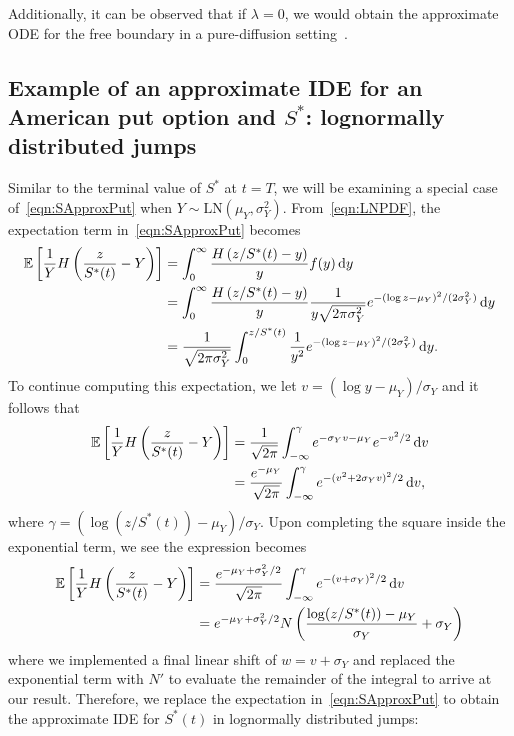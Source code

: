 Additionally, it can be observed that if $\lambda = 0$, we would obtain the approximate ODE for the free boundary in a pure-diffusion setting~\cite{Rodrigo2013}.

\subsection{Example of an approximate IDE for an American put option and $S^*$: lognormally distributed jumps}
Similar to the terminal value of $S^*$ at $t=T$, we will be examining a special case of~\eqref{eqn:SApproxPut} when $Y \sim \text{LN}(\mu_Y,\sigma_Y^2)$. From~\eqref{eqn:LNPDF}, the expectation term in~\eqref{eqn:SApproxPut} becomes
	\begin{align*}
		\mathbb E\left[ \frac{1}{Y}H\left( \frac{z}{S^*(t)} - Y \right) \right] &= \int_0^\infty \frac{H\left( z/S^*(t) - y \right)}{y}f(y) \, \mathrm d y \\ 
		&= \int_0^\infty \frac{H\left( z/S^*(t) - y \right)}{y}\frac{1}{y\sqrt{2\pi\sigma_Y^2}}e^{-(\log z - \mu_Y)^2/(2\sigma_Y^2)} \, \mathrm d y \\ 
		&= \frac{1}{\sqrt{2\pi\sigma_Y^2}}\int_0^{z/S^*(t)} \frac{1}{y^2}e^{-(\log z - \mu_Y)^2/(2\sigma_Y^2)} \, \mathrm d y.
	\end{align*}
To continue computing this expectation, we let $v = (\log y - \mu_Y)/\sigma_Y$ and it follows that
	\begin{align*}
		\mathbb E\left[ \frac{1}{Y}H\left( \frac{z}{S^*(t)} - Y \right) \right] &= \frac{1}{\sqrt{2\pi}} \int_{-\infty}^{\gamma} e^{-\sigma_Y v - \mu_Y}e^{-v^2/2} \, \mathrm d v \\
		&=  \frac{e^{-\mu_Y}}{\sqrt{2\pi}} \int_{-\infty}^{\gamma} e^{-(v^2 + 2\sigma_Yv)^2/2} \, \mathrm d v,
	\end{align*}
where $\gamma = (\log(z/S^*(t)) - \mu_Y)/\sigma_Y$. Upon completing the square inside the exponential term, we see the expression becomes
	\begin{align*}
		\mathbb E\left[ \frac{1}{Y}H\left( \frac{z}{S^*(t)} - Y \right) \right] &= \frac{e^{-\mu_Y + \sigma_Y^2/2}}{\sqrt{2\pi}} \int_{-\infty}^{\gamma} e^{-(v + \sigma_Y)^2/2} \, \mathrm d v \\
		&= e^{-\mu_Y + \sigma_Y^2/2}N\left( \frac{\log(z/S^*(t)) - \mu_Y}{\sigma_Y} + \sigma_Y \right)
	\end{align*}
where we implemented a final linear shift of $w = v + \sigma_Y$ and replaced the exponential term with $N'$ to evaluate the remainder of the integral to arrive at our result. Therefore, we replace the expectation in~\eqref{eqn:SApproxPut} to obtain the approximate IDE for $S^*(t)$ in lognormally distributed jumps:
